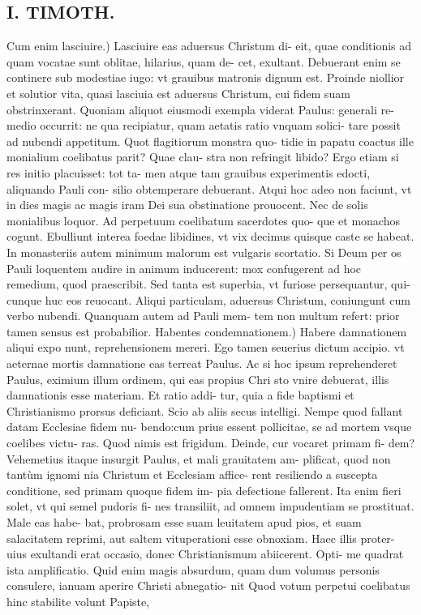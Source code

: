 \documentclass{article}
\begin{document}
\begin{pages}
\section*{I. TIMOTH. }
\marginpar{[ p.62 ]}\pstart Cum enim lasciuire.) Lasciuire eas aduersus Christum di- eit, quae conditionis ad quam vocatae sunt oblitae, hilarius, quam de- cet, exultant. Debuerant enim se continere sub modestiae iugo: vt grauibus matronis dignum est. Proinde niollior et solutior vita, quasi lasciuia est aduersus Christum, cui fidem suam obstrinxerant. Quoniam aliquot eiusmodi exempla viderat Paulus: generali re- medio occurrit: ne qua recipiatur, quam aetatis ratio vnquam solici- tare possit ad nubendi appetitum. Quot flagitiorum monstra quo- tidie in papatu coactus ille monialium coelibatus parit? Quae clau- stra non refringit libido? Ergo etiam si res initio placuisset: tot ta- men atque tam grauibus experimentis edocti, aliquando Pauli con- silio obtemperare debuerant. Atqui hoc adeo non faciunt, vt in dies magis ac magis iram Dei sua obstinatione prouocent. Nec de solis monialibus loquor. Ad perpetuum coelibatum sacerdotes quo- que et monachos cogunt. Ebulliunt interea foedae libidines, vt vix decimus quisque caste se habeat. In monasteriis autem minimum malorum est vulgaris scortatio. Si Deum per os Pauli loquentem audire in animum inducerent: mox confugerent ad hoc remedium, quod praescribit. Sed tanta est superbia, vt furiose persequantur, qui- cunque huc eos reuocant. Aliqui particulam, aduersus Christum, coniungunt cum verbo nubendi. Quanquam autem ad Pauli mem- tem non multum refert: prior tamen sensus est probabilior.  \pend\pstart Habentes condemnationem.) Habere damnationem aliqui expo nunt, reprehensionem mereri. Ego tamen seuerius dictum accipio. vt aeternae mortis damnatione eas terreat Paulus. Ac si hoc ipsum reprehenderet Paulus, eximium illum ordinem, qui eas propius Chri sto vnire debuerat, illis damnationis esse materiam. Et ratio addi- tur, quia a fide baptismi et Christianismo prorsus deficiant. Scio ab aliis secus intelligi. Nempe quod fallant datam Ecclesiae fidem nu- bendo:cum prius essent pollicitae, se ad mortem vsque coelibes victu- ras. Quod nimis est frigidum. Deinde, cur vocaret primam fi- dem? Vehemetius itaque insurgit Paulus, et mali grauitatem am- plificat, quod non tantùm ignomi nia Christum et Ecclesiam affice- rent resiliendo a suscepta conditione, sed primam quoque fidem im- pia defectione fallerent. Ita enim fieri solet, vt qui semel pudoris fi- nes transiliit, ad omnem impudentiam se prostituat. Male eas habe- bat, probrosam esse suam leuitatem apud pios, et suam salacitatem reprimi, aut saltem vituperationi esse obnoxiam. Haec illis proter- uius exultandi erat occasio, donec Christianismum abiicerent. Opti- me quadrat ista amplificatio. Quid enim magis absurdum, quam dum volumus personis consulere, ianuam aperire Christi abnegatio- nit Quod votum perpetui coelibatus hinc stabilite volunt Papiste,  \pend

\end{pages}
\end{document}
